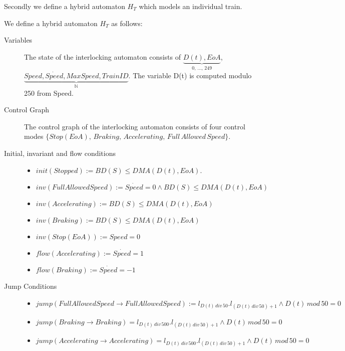 Secondly we define a hybrid automaton $H_{T}$ which models an individual train. 
\medskip
\begin{mydef}

We define a hybrid automaton $H_{T}$ as follows:
\begin{description}
\item[Variables] The state of the interlocking automaton consists of $\underbrace{D(t), EoA}_\text{0, \ldots , 249}$, \newline $\underbrace{Speed, \dot{Speed}, MaxSpeed, TrainID}_{\mathbb{N}}$. The variable D(t) is computed modulo 250 from Speed.

\item[Control Graph] The control graph of the interlocking automaton consists of four control modes $\{Stop (EoA), \, Braking, \, Accelerating, \, Full \, Allowed \, Speed \}$.

\item[Initial, invariant and flow conditions] \hspace*{0mm}
	\begin{itemize}
	\item $init(Stopped) :=   BD(S) \leq DMA(D(t),EoA)  $.

	\item $inv(Full Allowed Speed) :=   \dot{Speed} = 0 \wedge BD(S) \leq DMA(D(t),EoA)$ 

	\item $inv(Accelerating) := BD(S) \leq DMA(D(t),EoA)$

	\item $inv(Braking)  := BD(S) \leq DMA(D(t),EoA)$
	
	\item $inv(Stop (EoA)) := Speed = 0$ 
             
	\item $flow(Accelerating):= \dot{Speed} = 1$ 
	
	\item $flow(Braking) := \dot{Speed} = -1$
 
  
	
	\end{itemize}

\item[Jump Conditions] \hspace*{0mm}

	\begin{itemize}
	\item $jump(Full Allowed Speed \to Full Allowed Speed) := l_{D(t) \, div \, 50}.l_{(D(t) \, div \, 50) +1} \wedge D(t) \, mod \, 50 = 0$
\item $jump(Braking \to Braking) = l_{D(t) \, div \, 500}.l_{(D(t) \, div \, 50) +1} \wedge D(t) \, mod \, 50 = 0$
\item $jump(Accelerating \to Accelerating) = l_{D(t) \, div \, 500}.l_{(D(t) \, div \, 50) +1} \wedge D(t) \, mod \, 50 = 0$


\end{itemize}
\end{description}
\end{mydef}
